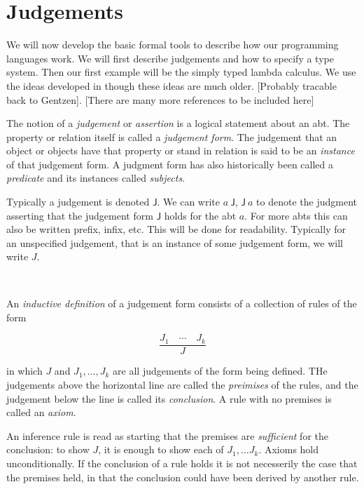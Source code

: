 \section{Judgements}

We will now develop the basic formal tools to describe how our programming languages work.  We will first describe judgements and how to specify a type system. Then our first example will be the simply typed lambda calculus. We use the ideas developed in \cite{harper_2016} though these ideas are much older. [Probably tracable back to Gentzen]. [There are many more references to be included here]

\begin{defin}
    The notion of a \emph{judgement} or \emph{assertion} is a logical statement about an abt. The property or relation itself is called a \emph{judgement form}. The judgement that an object or objects have that property or stand in relation is said to be an \emph{instance} of that judgement form. A judgment form has also historically been called a \emph{predicate} and its instances called \emph{subjects}.
\end{defin}

\begin{remark}
    Typically a judgement is denoted $\mathsf{J}$. We can write $a\ \mathsf{J}$, $\mathsf{J}\ a$ to denote the judgment asserting that the judgement form $\mathsf{J}$ holds for the abt $a$. For more abts this can also be written prefix, infix, etc. This will be done for readability. Typically for an unspecified judgement, that is an instance of some judgement form, we will write $J$.
\end{remark}

    $$\frac
        {}
        {}
    $$


\begin{defin}
    An \emph{inductive definition} of a judgement form consists of a collection of rules of the form
    
    $$\frac
        {J_1 \quad \cdots \quad J_k}
        {J}
    $$
    
    in which $J$ and $J_1, \dots , J_k$ are all judgements of the form being defined. THe judgements above the horizontal line are called the \emph{preimises} of the rules, and the judgement below the line is called its \emph{conclusion}. A rule with no premises is called an \emph{axiom}.
\end{defin}

\begin{remark}
    An inference rule is read as starting that the premises are \emph{sufficient} for the conclusion: to show $J$, it is enough to show each of $J_1, \dots J_k$. Axioms hold unconditionally. If the conclusion of a rule holds it is not necesserily the case that the premises held, in that the conclusion could have been derived by another rule.
\end{remark}

